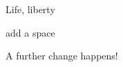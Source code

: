 \documentclass{article}
\begin{document}
Life, liberty
 
 add a space
 
 A further change happens!
 
\end{document}
